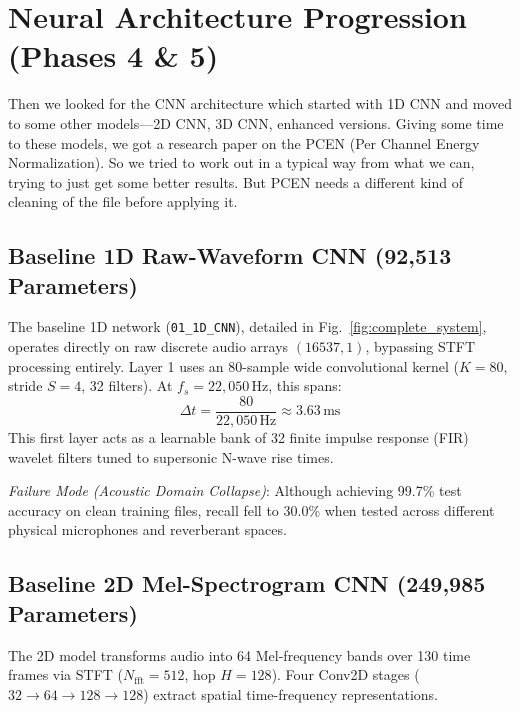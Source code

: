 \documentclass[conference]{IEEEtran}
\begin{document}
\section{Neural Architecture Progression (Phases 4 \& 5)}
\label{sec:architectures}

Then we looked for the CNN architecture which started with 1D CNN and moved to some other models---2D CNN, 3D CNN, enhanced versions. Giving some time to these models, we got a research paper on the PCEN (Per Channel Energy Normalization). So we tried to work out in a typical way from what we can, trying to just get some better results. But PCEN needs a different kind of cleaning of the file before applying it.

\subsection{Baseline 1D Raw-Waveform CNN (92,513 Parameters)}
The baseline 1D network (\texttt{01\_1D\_CNN}), detailed in Fig.~\ref{fig:complete_system}, operates directly on raw discrete audio arrays $(16537, 1)$, bypassing STFT processing entirely. Layer 1 uses an 80-sample wide convolutional kernel ($K=80$, stride $S=4$, 32 filters). At $f_s = 22{,}050\,\text{Hz}$, this spans:
\begin{equation}
    \Delta t = \frac{80}{22{,}050\,\text{Hz}} \approx 3.63\,\text{ms}
    \label{eq:kernel_duration}
\end{equation}
This first layer acts as a learnable bank of 32 finite impulse response (FIR) wavelet filters tuned to supersonic N-wave rise times.

\textit{Failure Mode (Acoustic Domain Collapse)}: Although achieving 99.7\% test accuracy on clean training files, recall fell to 30.0\% when tested across different physical microphones and reverberant spaces.

\subsection{Baseline 2D Mel-Spectrogram CNN (249,985 Parameters)}
The 2D model transforms audio into 64 Mel-frequency bands over 130 time frames via STFT ($N_{\text{fft}} = 512$, hop $H = 128$). Four Conv2D stages ($32 \to 64 \to 128 \to 128$) extract spatial time-frequency representations.
\end{document}
